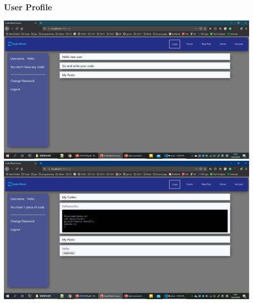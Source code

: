 \subsubsection{User Profile}
\includegraphics[scale=0.45]{Doc/Pics/new_user.png}
\includegraphics[scale=0.45]{Doc/Pics/user_with_code.png}


